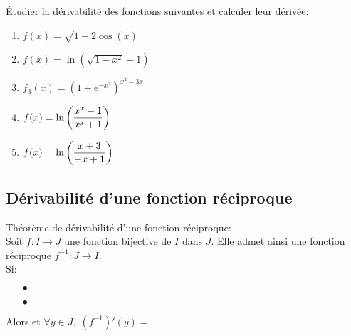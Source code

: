 \documentclass[a4paper, 11pt]{article}
\begin{document}
{\footnotesize \begin{exercice}
	\'Etudier la d\'erivabilit\'e des fonctions suivantes et calculer leur d\'eriv\'ee:
	\begin{enumerate}
		\item $f(x)=\sqrt{1-2\cos{(x)}}$ \vsec
		\item $f(x)=\ln{\left( \sqrt{1-x^2} +1 \right)}$\vsec
		\item $f_3(x)=\left( 1+e^{-x^2} \right)^{x^2-3x}$


		\item $f(x)=\ln{\left( \displaystyle\frac{ x^x-1 }{x^x+1} \right)}$
		\item $f(x)=\ln{\left( \displaystyle\frac{x+3}{-x+1} \right)}$

	\end{enumerate}
\end{exercice}}

\subsection{D\'erivabilit\'e d'une fonction r\'eciproque}


{\noindent

	\begin{theorem} Th\'eor\`{e}me de d\'erivabilit\'e d'une fonction r\'eciproque: \\
		\noindent Soit $f: I\rightarrow J$ une fonction bijective de $I$ dans $J$.  Elle admet ainsi  une fonction r\'eciproque $f^{-1}: J\rightarrow I$.\\
		Si:
		\begin{itemize}
			\item[$\bullet$] \dotfill\vsec
			\item[$\bullet$] \dotfill\vsec
		\end{itemize}
		\noindent Alors \dotfill et $\forall y \in J, \; (f^{-1})'(y) = $ \dotfill \vsec\vsec
	\end{theorem}
}
\end{document}
